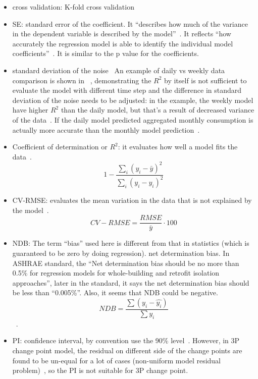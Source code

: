 \documentclass[12pt]{article}
\begin{document}
  \begin{itemize}
  \item cross validation: K-fold cross validation~\cite{case2012saving}
  \item SE: standard error of the coefficient. It ``describes how much
    of the variance in the dependent variable is described by the
    model''~\cite{hammarsten1987critical}. It reflects ``how
    accurately the regression model is able to identify the individual
    model coefficients''~\cite{reddy1997baselining}. It is similar to
    the p value for the coefficients.
  \item standard deviation of the noise~\cite{hammarsten1987critical}
    An example of daily vs weekly data comparison is shown in
    ~\cite{hammarsten1987critical}, demonstrating the $R^2$ by
    itself is not sufficient to evaluate the model with different
    time step and the difference in standard deviation of the
    noise needs to be adjusted: in the example, the weekly model
    have higher $R^2$ than the daily model, but that's a result of
    decreased variance of the
    data~\cite{hammarsten1987critical}. If the daily model
    predicted aggregated monthly consumption is actually more
    accurate than the monthly model
    prediction~\cite{hammarsten1987critical}.
  \item Coefficient of determination or $R^2$: it evaluates how well a
    model fits the data~\cite{reddy1997baselining}.
    \begin{equation}
      \label{eq:r2}
    1 - \frac{\sum_i(y_i - \bar{y})^2}{\sum_i(y_i - \hat{y_i})^2}
    \end{equation}
\item CV-RMSE: evaluates the mean variation in the data that is not explained by the model~\cite{reddy1997baselining}.
  $$CV-RMSE = \frac{RMSE}{\bar{y}} \cdot 100$$
\item NDB: The term ``bias'' used here is different from that in
  statistics (which is guaranteed to be zero by doing regression). net
  determination bias. In ASHRAE standard, the ``Net determination bias
  should be no more than 0.5\% for regression models for
  whole-building and retrofit isolation approaches'', later in the
  standard, it says the net determination bias should be less than
  ``0.005\%''. Also, it seems that NDB could be negative.
  $$NDB = \frac{\sum(y_i - \hat{y_i})}{\sum y_i}$$~\cite{Kim2015}.
\item PI: confidence interval, by convention use the 90\%
  level~\cite{reddy1997baselining}. However, in 3P change point model,
  the residual on different side of the change points are found to be
  un-equal for a lot of cases (non-uniform model residual
  problem)~\cite{reddy1997baselining}, so the PI is not suitable for
  3P change point.
\end{itemize}
\end{document}
